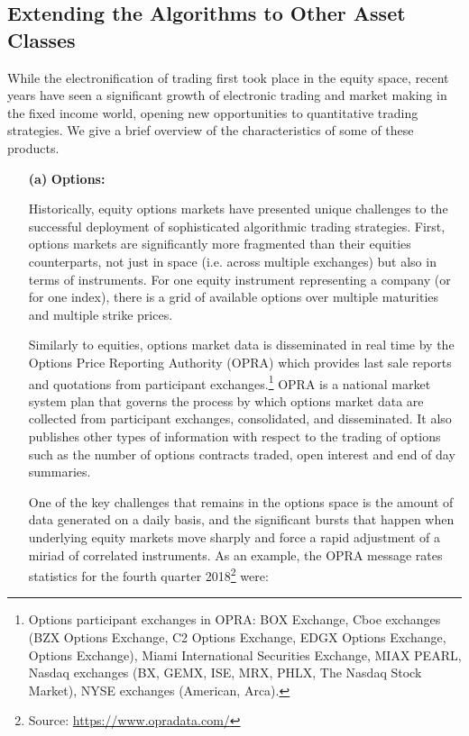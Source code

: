 \subsection{Extending the Algorithms to Other Asset Classes}


While the electronification of trading first took place in the equity space, recent years have seen a significant growth of electronic trading and market making in the fixed income world, opening new opportunities to quantitative trading strategies. We give a brief overview of the characteristics of some of these products. 


\begin{enumerate}
\item[\textbf{(a)}] \textbf{Options:} 

Historically, equity options markets have presented unique challenges to the successful deployment of sophisticated algorithmic trading strategies. First, options markets are significantly more fragmented than their equities counterparts, not just in space (i.e. across multiple exchanges) but also in terms of instruments. For one equity instrument representing a company (or for one index), there is a grid of available options over multiple maturities and multiple strike prices.  

Similarly to equities, options market data is disseminated in real time by the Options Price Reporting Authority (OPRA) which provides last sale reports and quotations from participant exchanges.\footnote{Options participant exchanges in OPRA: BOX Exchange, Cboe exchanges (BZX Options Exchange, C2 Options Exchange, EDGX Options Exchange, Options Exchange), Miami International Securities Exchange, MIAX PEARL, Nasdaq exchanges (BX, GEMX, ISE, MRX, PHLX, The Nasdaq Stock Market), NYSE exchanges (American, Arca).} OPRA is a national market system plan that governs the process by which options market data are collected from participant exchanges, consolidated, and disseminated. It also publishes other types of information with respect to the trading of options such as the number of options contracts traded, open interest and end of day summaries. 

One of the key challenges that remains in the options space is the amount of data generated on a daily basis, and the significant bursts that happen when underlying equity markets move sharply and force a rapid adjustment of a miriad of correlated instruments. As an example, the OPRA message rates statistics for the fourth quarter 2018\footnote{Source: \url{https://www.opradata.com/}} were: \\


\end{enumerate}

